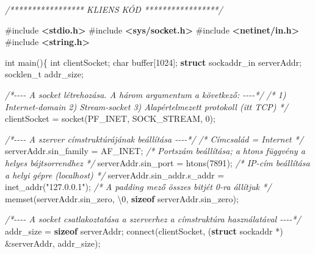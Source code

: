 \documentclass[
]{article}
\newenvironment{Shaded}{}{}
\newcommand{\CharTok}[1]{\textcolor[rgb]{0.25,0.44,0.63}{#1}}
\newcommand{\CommentTok}[1]{\textcolor[rgb]{0.38,0.63,0.69}{\textit{#1}}}
\newcommand{\DataTypeTok}[1]{\textcolor[rgb]{0.56,0.13,0.00}{#1}}
\newcommand{\DecValTok}[1]{\textcolor[rgb]{0.25,0.63,0.44}{#1}}
\newcommand{\ImportTok}[1]{\textcolor[rgb]{0.00,0.50,0.00}{\textbf{#1}}}
\newcommand{\KeywordTok}[1]{\textcolor[rgb]{0.00,0.44,0.13}{\textbf{#1}}}
\newcommand{\NormalTok}[1]{#1}
\newcommand{\OperatorTok}[1]{\textcolor[rgb]{0.40,0.40,0.40}{#1}}
\newcommand{\PreprocessorTok}[1]{\textcolor[rgb]{0.74,0.48,0.00}{#1}}
\newcommand{\SpecialCharTok}[1]{\textcolor[rgb]{0.25,0.44,0.63}{#1}}
\newcommand{\StringTok}[1]{\textcolor[rgb]{0.25,0.44,0.63}{#1}}
\begin{document}
\begin{Shaded}
\begin{Highlighting}[]
\CommentTok{/***************** KLIENS KÓD *****************/}

\PreprocessorTok{\#include }\ImportTok{\textless{}stdio.h\textgreater{}}
\PreprocessorTok{\#include }\ImportTok{\textless{}sys/socket.h\textgreater{}}
\PreprocessorTok{\#include }\ImportTok{\textless{}netinet/in.h\textgreater{}}
\PreprocessorTok{\#include }\ImportTok{\textless{}string.h\textgreater{}}

\DataTypeTok{int}\NormalTok{ main}\OperatorTok{()\{}
  \DataTypeTok{int}\NormalTok{ clientSocket}\OperatorTok{;}
  \DataTypeTok{char}\NormalTok{ buffer}\OperatorTok{[}\DecValTok{1024}\OperatorTok{];}
  \KeywordTok{struct}\NormalTok{ sockaddr\_in serverAddr}\OperatorTok{;}
\NormalTok{  socklen\_t addr\_size}\OperatorTok{;}

  \CommentTok{/*{-}{-}{-}{-} A socket létrehozása. A három argumentum a következő: {-}{-}{-}{-}*/}
  \CommentTok{/* 1) Internet{-}domain 2) Stream{-}socket 3) Alapértelmezett protokoll (itt TCP) */}
\NormalTok{  clientSocket }\OperatorTok{=}\NormalTok{ socket}\OperatorTok{(}\NormalTok{PF\_INET}\OperatorTok{,}\NormalTok{ SOCK\_STREAM}\OperatorTok{,} \DecValTok{0}\OperatorTok{);}

  \CommentTok{/*{-}{-}{-}{-} A szerver címstruktúrájának beállítása {-}{-}{-}{-}*/}
  \CommentTok{/* Címcsalád = Internet */}
\NormalTok{  serverAddr}\OperatorTok{.}\NormalTok{sin\_family }\OperatorTok{=}\NormalTok{ AF\_INET}\OperatorTok{;}
  \CommentTok{/* Portszám beállítása; a htons függvény a helyes bájtsorrendhez */}
\NormalTok{  serverAddr}\OperatorTok{.}\NormalTok{sin\_port }\OperatorTok{=}\NormalTok{ htons}\OperatorTok{(}\DecValTok{7891}\OperatorTok{);}
  \CommentTok{/* IP{-}cím beállítása a helyi gépre (localhost) */}
\NormalTok{  serverAddr}\OperatorTok{.}\NormalTok{sin\_addr}\OperatorTok{.}\NormalTok{s\_addr }\OperatorTok{=}\NormalTok{ inet\_addr}\OperatorTok{(}\StringTok{"127.0.0.1"}\OperatorTok{);}
  \CommentTok{/* A padding mező összes bitjét 0{-}ra állítjuk */}
\NormalTok{  memset}\OperatorTok{(}\NormalTok{serverAddr}\OperatorTok{.}\NormalTok{sin\_zero}\OperatorTok{,} \CharTok{\textquotesingle{}}\SpecialCharTok{\textbackslash{}0}\CharTok{\textquotesingle{}}\OperatorTok{,} \KeywordTok{sizeof}\NormalTok{ serverAddr}\OperatorTok{.}\NormalTok{sin\_zero}\OperatorTok{);}

  \CommentTok{/*{-}{-}{-}{-} A socket csatlakoztatása a szerverhez a címstruktúra használatával {-}{-}{-}{-}*/}
\NormalTok{  addr\_size }\OperatorTok{=} \KeywordTok{sizeof}\NormalTok{ serverAddr}\OperatorTok{;}
\NormalTok{  connect}\OperatorTok{(}\NormalTok{clientSocket}\OperatorTok{,} \OperatorTok{(}\KeywordTok{struct}\NormalTok{ sockaddr }\OperatorTok{*)} \OperatorTok{\&}\NormalTok{serverAddr}\OperatorTok{,}\NormalTok{ addr\_size}\OperatorTok{);}


\end{Highlighting}
\end{Shaded}
\end{document}
